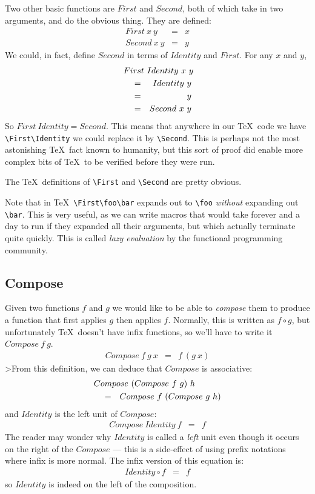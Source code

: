 Two other basic functions are $First$ and $Second$, both of which
take in two arguments, and do the obvious thing.  They are defined:
\begin{eqnarray*}
    First~x~y  &  =  &  x  \\
   Second~x~y  &  =  &  y
\end{eqnarray*}
We could, in
fact, define $Second$ in terms of $Identity$ and $First$.  
For any $x$ and $y$,
\begin{eqnarray*}
   \start{First~Identity~x~y}  
   &  =  &  Identity~y  \\
   &  =  &  y  \\
   &  =  &  Second~x~y
\end{eqnarray*}
So $First~Identity = Second$.  This means that anywhere in our \TeX\ code
we have \verb|\First\Identity| we could replace it by \verb|\Second|.
This is perhaps not the most astonishing \TeX\ fact known to humanity,
but this sort of proof did enable more complex bits of \TeX\ to be
verified before they were run.

The \TeX\ definitions of \verb|\First| and \verb|\Second| are pretty
obvious.
\begin{TeXcode}
\def\First#1#2{#1}
\def\Second#1#2{#2}
\end{TeXcode}
Note that in \TeX\, \verb|\First\foo\bar| expands out to
\verb|\foo| {\em without\/} expanding out \verb|\bar|.
This is very useful, as we can write macros that would take
forever and a day to run if they expanded all their arguments,
but which actually terminate quite quickly.  This is called
{\em lazy evaluation\/} by the functional programming community.

\subsection{Compose}

Given two functions $f$ and $g$ we would like to be able to {\em compose\/}
them to produce a function that first applies $g$ then applies $f$.
Normally, this is written as $f \circ g$, but unfortunately \TeX\ doesn't
have infix functions, so we'll have to write it $Compose~f~g$.
\begin{eqnarray*}
   Compose~f~g~x  &  =  &  f~(g~x)
\end{eqnarray*}
>From this definition, we can deduce that $Compose$ is associative:
\begin{eqnarray*}
   \start{Compose~(Compose~f~g)~h}  
   &  =  &  Compose~f~(Compose~g~h)
\end{eqnarray*}
and $Identity$ is the left unit of $Compose$:
\begin{eqnarray*}
        Compose~Identity~f  &  =  &  f 
\end{eqnarray*}
The reader may wonder why $Identity$ is called a {\em left\/} unit
even though it occurs on the right of the $Compose$ --- this is a side-effect
of using prefix notations where infix is more normal.  The infix version
of this equation is:
\begin{eqnarray*}
   Identity \circ f  &  =  &  f
\end{eqnarray*}
so $Identity$ is indeed on the left of the composition.

